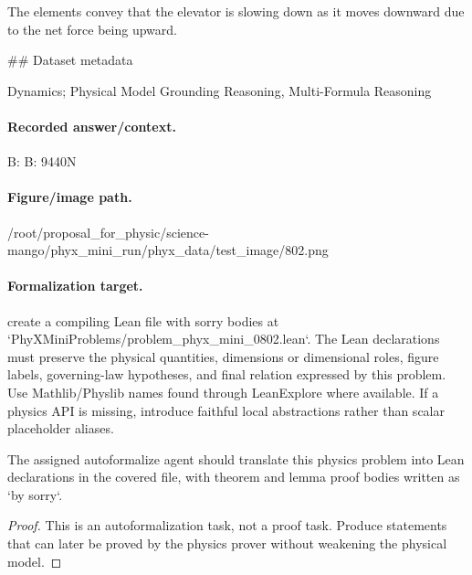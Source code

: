 The elements convey that the elevator is slowing down as it moves downward due to the net force being upward.

\#\# Dataset metadata

Dynamics; Physical Model Grounding Reasoning, Multi-Formula Reasoning

\paragraph{Recorded answer/context.}
B: B: 9440N

\paragraph{Figure/image path.}
/root/proposal\_for\_physic/science-mango/phyx\_mini\_run/phyx\_data/test\_image/802.png

\paragraph{Formalization target.}
create a compiling Lean file with sorry bodies at `PhyXMiniProblems/problem\_phyx\_mini\_0802.lean`. The Lean declarations must preserve the physical quantities, dimensions or dimensional roles, figure labels, governing-law hypotheses, and final relation expressed by this problem.
Use Mathlib/Physlib names found through LeanExplore where available. If a physics API is missing, introduce faithful local abstractions rather than scalar placeholder aliases.

\begin{theorem}
\label{thm:physics:phyx_mini_0802:target}
The assigned autoformalize agent should translate this physics problem into Lean declarations in the covered file, with theorem and lemma proof bodies written as `by sorry`.
\end{theorem}
\begin{proof}
This is an autoformalization task, not a proof task. Produce statements that can later be proved by the physics prover without weakening the physical model.
\end{proof}

